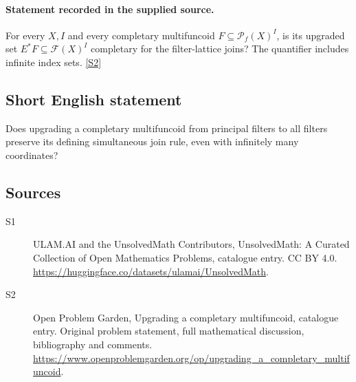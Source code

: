 \documentclass[11pt]{article}
\newcommand{\sref}[2]{\hyperlink{source:#1:#2}{[S#2]}}
\begin{document}
\paragraph{Statement recorded in the supplied source.}
For every $X,I$ and every completary multifuncoid $F\subseteq\mathcal P_f(X)^I$, is its upgraded set $E^*F\subseteq\mathcal F(X)^I$ completary for the filter-lattice joins? The quantifier includes infinite index sets. \sref{statement}{2}
\subsection{Short English statement}
Does upgrading a completary multifuncoid from principal filters to all filters preserve its defining simultaneous join rule, even with infinitely many coordinates?
\subsection{Sources}
\begin{description}
\item[\hypertarget{source:statement:1}{S1}] ULAM.AI and the UnsolvedMath Contributors, UnsolvedMath: A Curated Collection of Open Mathematics Problems, catalogue entry. CC BY 4.0. \url{https://huggingface.co/datasets/ulamai/UnsolvedMath}.
\item[\hypertarget{source:statement:2}{S2}] Open Problem Garden, Upgrading a completary multifuncoid, catalogue entry. Original problem statement, full mathematical discussion, bibliography and comments. \url{https://www.openproblemgarden.org/op/upgrading_a_completary_multifuncoid}.
\end{description}
\label{end:statement}
\end{document}
